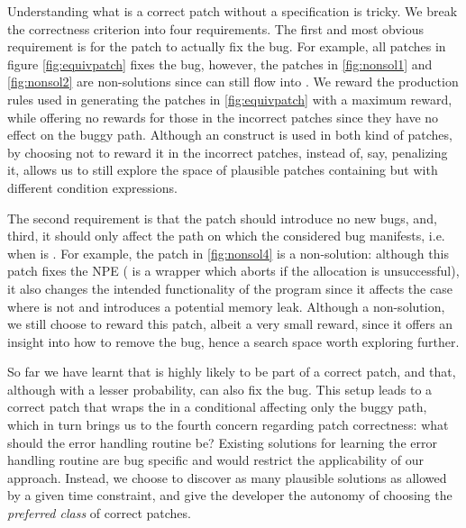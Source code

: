 Understanding what is a correct patch without a specification is tricky. We break the correctness criterion into four requirements. The first and most obvious requirement is for the patch to actually fix the bug. For example, all patches in figure 
\autoref{fig:equivpatch} fixes the bug, however, the patches in \autoref{fig:nonsol1} and \autoref{fig:nonsol2} are non-solutions since  can still flow into . We reward the production rules used in generating  the patches in 
\autoref{fig:equivpatch} with a maximum reward, while offering no rewards for those in the incorrect patches since they have no effect on the buggy path. Although an  construct is used in both kind of patches, by choosing not to reward it in the incorrect patches, instead of, say, penalizing it, allows us to still explore the space of plausible patches containing  but with different condition expressions. 



The second requirement is that the patch should introduce no new bugs, and, third, it should only affect the path on which the considered bug manifests, i.e. when   is .
For example, the patch in  \autoref{fig:nonsol4} is a non-solution:  
although this patch fixes the NPE ( is a wrapper which aborts if the allocation is unsuccessful), it also changes the intended functionality of the program since it affects the case where  is not  and introduces a potential memory leak. Although a non-solution, we still choose to reward this patch, albeit a very small reward, since it offers an 
insight into how to remove the bug, hence a search space worth exploring further. 

So far we have learnt that  is highly likely to be part of a correct patch, and that, although with a lesser probability,  can also fix the bug. This setup leads to a correct patch that wraps the  in a conditional affecting only the buggy path, which in turn brings us to the fourth concern regarding patch correctness: what should the error handling routine be? Existing solutions for learning the error handling routine \cite{Junhee2022} are bug specific and would restrict the applicability of our approach. 
Instead, we choose to discover as many plausible solutions as allowed by a given time constraint, and give the developer the autonomy of choosing the \emph{preferred class} of correct patches. 

